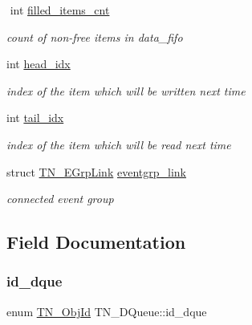 \begin{DoxyCompactItemize}
$$\mbox{\label{structTN__DQueue_a536190a17aff0355de36d8d68aa7d98c}} 
int \hyperlink{structTN__DQueue_a536190a17aff0355de36d8d68aa7d98c}{filled\+\_\+items\+\_\+cnt}
\begin{DoxyCompactList}\small\item\em count of non-\/free items in {\ttfamily data\+\_\+fifo} \end{DoxyCompactList}\item 
\mbox{\label{structTN__DQueue_a3451096f72cc02a2bed5573c2457323e}} 
int \hyperlink{structTN__DQueue_a3451096f72cc02a2bed5573c2457323e}{head\+\_\+idx}
\begin{DoxyCompactList}\small\item\em index of the item which will be written next time \end{DoxyCompactList}\item 
\mbox{\label{structTN__DQueue_ab5451b7c143d4208c36d4227b79732a0}} 
int \hyperlink{structTN__DQueue_ab5451b7c143d4208c36d4227b79732a0}{tail\+\_\+idx}
\begin{DoxyCompactList}\small\item\em index of the item which will be read next time \end{DoxyCompactList}\item 
\mbox{\label{structTN__DQueue_a4c7d686c2f9f6a6bc2f875e1c4849ae1}} 
struct \hyperlink{structTN__EGrpLink}{T\+N\+\_\+\+E\+Grp\+Link} \hyperlink{structTN__DQueue_a4c7d686c2f9f6a6bc2f875e1c4849ae1}{eventgrp\+\_\+link}
\begin{DoxyCompactList}\small\item\em connected event group \end{DoxyCompactList}\end{DoxyCompactItemize}


\subsection{Field Documentation}
\mbox{\label{structTN__DQueue_afce2b73b8afc3b1537e34ff3a4a7114c}} 
\subsubsection{\texorpdfstring{id\+\_\+dque}{id\_dque}}
{\footnotesize\ttfamily enum \hyperlink{tn__common_8h_ae779dd1f6735f6e139fb70acd004d976}{T\+N\+\_\+\+Obj\+Id} T\+N\+\_\+\+D\+Queue\+::id\+\_\+dque}



